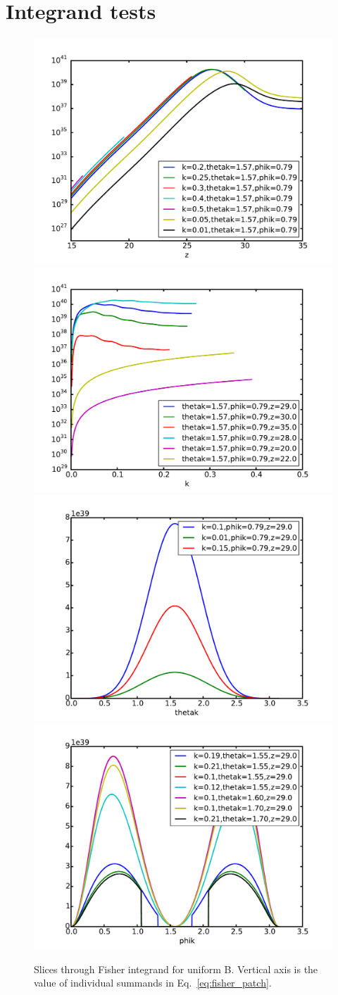 \documentclass[12pt]{paper}
\begin{document}
\appendix
\section{Integrand tests}
\label{tests}

\begin{figure}[h]
\centering
\includegraphics[width=.45\textwidth,keepaspectratio=true]{test_z.pdf}
\includegraphics[width=.45\textwidth,keepaspectratio=true]{test_k.pdf}
\includegraphics[width=.45\textwidth,keepaspectratio=true]{test_thetak.pdf}
\includegraphics[width=.45\textwidth,keepaspectratio=true]{test_phik.pdf}
\caption{Slices through Fisher integrand for uniform B. Vertical axis is the value of individual summands in Eq.~\ref{eq:fisher_patch}.\label{fig:tests}}
\end{figure}
\end{document}
